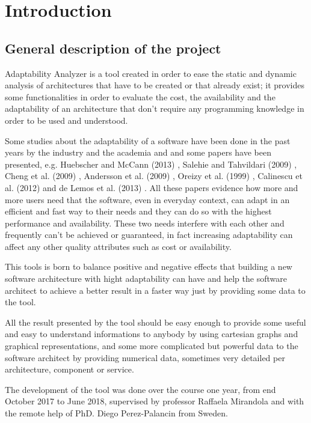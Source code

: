 \chapter{Introduction}
\label{cap:introduction}
\section{General description of the project}
Adaptability Analyzer is a tool created in order to ease the static and dynamic analysis of architectures that have to be created or that already exist; it provides some functionalities in order to evaluate the cost, the availability and the adaptability of an architecture that don't require any programming knowledge in order to be used and understood.

Some studies about the adaptability of a software have been done in the past years by the industry and the academia and and some papers have been presented, e.g. Huebscher and McCann (2013) \cite{survey-aut-comp}, Salehie and Tahvildari (2009) \cite{self-adap-soft}, Cheng et al. (2009) \cite{soft-eng-for-sas-1}, Andersson et al. (2009) \cite{soft-eng-for-sas-3}, Oreizy et al. (1999) \cite{arch-based-appr-to-sas}, Calinescu et al. (2012) \cite{sas-quant-ver} and de Lemos et al. (2013) \cite{soft-eng-for-sas-2}. All these papers evidence how more and more users need that the software, even in everyday context, can adapt in an efficient and fast way to their needs and they can do so with the highest performance and availability. These two needs interfere with each other and frequently can't be achieved or guaranteed, in fact increasing adaptability can affect any other quality attributes such as cost or availability.

This tools is born to balance positive and negative effects that building a new software architecture with hight adaptability can have and help the software architect to achieve a better result in a faster way just by providing some data to the tool.

All the result presented by the tool should be easy enough to provide some useful and easy to understand informations to anybody by using cartesian graphs and graphical representations, and some more complicated but powerful data to the software architect by providing numerical data, sometimes very detailed per architecture, component or service.

The development of the tool was done over the course one year, from end October 2017 to June 2018, supervised by professor Raffaela Mirandola and with the remote help of PhD. Diego Perez-Palancin from Sweden.

